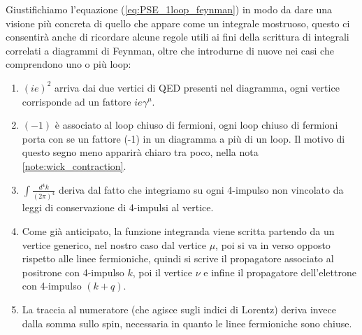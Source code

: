 \documentclass[../main.tex]{subfiles}
\begin{document}
Giustifichiamo l'equazione (\ref{eq:PSE_1loop_feynman}) in modo da dare una visione più concreta di quello che appare come un integrale mostruoso, questo ci consentirà anche di ricordare alcune regole utili ai fini della scrittura di integrali correlati a diagrammi di Feynman, oltre che introdurne di nuove nei casi che comprendono uno o più loop:
\begin{enumerate}
    \item $(ie)^2$ arriva dai due vertici di QED presenti nel diagramma, ogni vertice corrisponde ad un fattore $ie\gamma^\mu$.
    
    \item $(-1)$ è associato al loop chiuso di fermioni, ogni loop chiuso di fermioni porta con se un fattore (-1) in un diagramma a più di un loop. Il motivo di questo segno meno apparirà chiaro tra poco, nella nota \ref{note:wick_contraction}.
    
    \item $\int \frac{d^4k}{(2\pi)^4}$ deriva dal fatto che integriamo su ogni 4-impulso non vincolato da leggi di conservazione di 4-impulsi al vertice.
    
    \item Come già anticipato, la funzione integranda viene scritta partendo da un vertice generico, nel nostro caso dal vertice $\mu$, poi si va in verso opposto rispetto alle linee fermioniche, quindi si scrive il propagatore associato al positrone con 4-impulso $k$, poi il vertice $\nu$ e infine il propagatore dell'elettrone con 4-impulso $(k+q)$.
    
    \item La traccia al numeratore (che agisce sugli indici di Lorentz) deriva invece dalla somma sullo spin, necessaria in quanto le linee fermioniche sono chiuse.
\end{enumerate}
\end{document}
